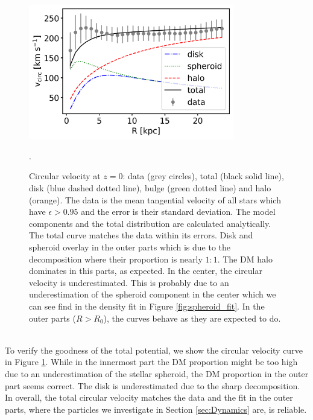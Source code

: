 \begin{figure}[htbp]
\captionsetup{format=plain}
\centering
\includegraphics[width=0.8\textwidth]{plots/Auriga/best_fit_circular_velocity_via_formula_snap_127.png}
\caption{Circular velocity at $z = 0$: data (grey circles), total (black solid line), disk (blue dashed dotted line), bulge (green dotted line) and halo (orange). The data is the mean tangential velocity of all stars which have $\epsilon > 0.95$ and the error is their standard deviation. The model components and the total distribution are calculated analytically. The total curve matches the data within its errors. Disk and spheroid overlay in the outer parts which is due to the decomposition where their proportion is nearly $1:1$. The \ac{DM} halo dominates in this parts, as expected. In the center, the circular velocity is underestimated. This is probably due to an underestimation of the spheroid component in the center which we can see find in the density fit in Figure \ref{fig:spheroid_fit}. In the outer parts ($R>R_0$), the curves behave as they are expected to do.}. \label{fig:circ_vel_fit}
\end{figure}
\\To verify the goodness of the total potential, we show the circular velocity curve in Figure \ref{fig:circ_vel_fit}. While in the innermost part the \ac{DM} proportion might be too high due to an underestimation of the stellar spheroid, the \ac{DM} proportion in the outer part seems correct. The disk is underestimated due to the sharp decomposition. In overall, the total circular velocity matches the data and the fit in the outer parts, where the particles we investigate in Section \ref{sec:Dynamics} are, is reliable.  

